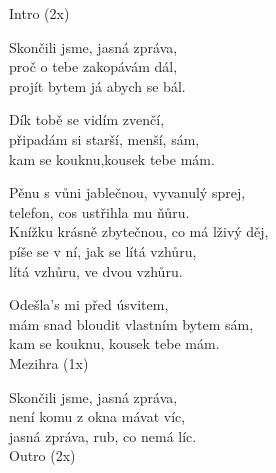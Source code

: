 
\re{}
Intro (2x)

\ve{}
Skončili jsme, jasná zpráva,\\
proč o tebe zakopávám dál,\\
projít bytem já abych se bál.

Dík tobě se vidím zvenčí,\\
připadám si starší, menší, sám,\\
kam se kouknu,kousek tebe mám.

\cho{}
Pěnu s vůni jablečnou, vyvanulý sprej,\\
telefon, cos ustřihla mu ňůru.\\
Knížku krásně zbytečnou, co má lživý děj,\\
píše se v ní, jak se lítá vzhůru,\\
lítá vzhůru, ve dvou vzhůru. 

\ve{}
Odešla's mi před úsvitem,\\
mám snad bloudit vlastním bytem sám,\\
kam se kouknu, kousek tebe mám. \\

Mezihra (1x)

\cho{}

\ve{}
Skončili jsme, jasná zpráva,\\
není komu z okna mávat víc,\\
jasná zpráva, rub, co nemá líc.\\

Outro (2x)

\esong
